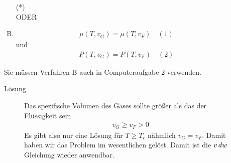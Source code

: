 \begin{description}
\begin{enumerate}[A)]
        (*) \\ ODER
      \item %
      \begin{align*}
        \mu (T, v_G) = \mu(T, v_F) \quad (1)
      \end{align*}
      und 
      \begin{align*}
        P(T, v_G) = P(T, v_F) \quad (2)
      \end{align*}
    \end{enumerate} 
    Sie m\"ussen Verfahren B auch in Computeraufgabe 2 verwenden.
    \begin{description}
      \item[L\"osung] Das spezifische Volumen des Gases sollte gr\"o\ss{}er
        als das der Fl\"ussigkeit sein
        \begin{align*}
          v_G \ge v_F > 0
        \end{align*}
       Es gibt also nur eine L\"osung f\"ur $T \ge T_c$ n\"ahmlich
       $v_G = v_F$. Damit haben wir das Problem im wesentlichen gel\"ost.
       Damit ist die $v \,dw\,$ Gleichung wieder anwendbar.
      

\end{description}
\end{description}
